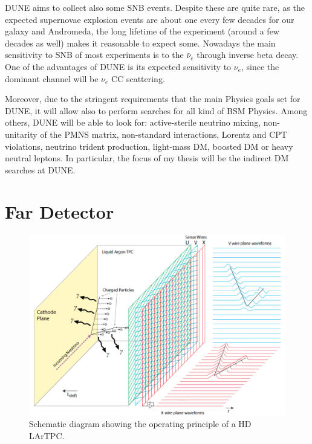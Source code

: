 DUNE aims to collect also some SNB events. Despite these are quite rare, as the expected supernovae explosion events are about one every few decades for our galaxy and Andromeda, the long lifetime of the experiment (around a few decades as well) makes it reasonable to expect some. Nowadays the main sensitivity to SNB of most experiments is to the $\bar{\nu}_{e}$ through inverse beta decay. One of the advantages of DUNE is its expected sensitivity to $\nu_{e}$, since the dominant channel will be $\nu_{e}$ CC scattering.

Moreover, due to the stringent requirements that the main Physics goals set for DUNE, it will allow also to perform searches for all kind of BSM Physics. Among others, DUNE will be able to look for: active-sterile neutrino mixing, non-unitarity of the PMNS matrix, non-standard interactions, Lorentz and CPT violations, neutrino trident production, light-mass DM, boosted DM or heavy neutral leptons. In particular, the focus of my thesis will be the indirect DM searches at DUNE.

\section{}

\section{Far Detector}

\begin{figure}[t]
	\centering
	\includegraphics[width=0.8\linewidth]{Images/DUNE/FD/tpc}
	\caption{Schematic diagram showing the operating principle of a HD LArTPC.}
	\label{fig:tpc}
\end{figure}


